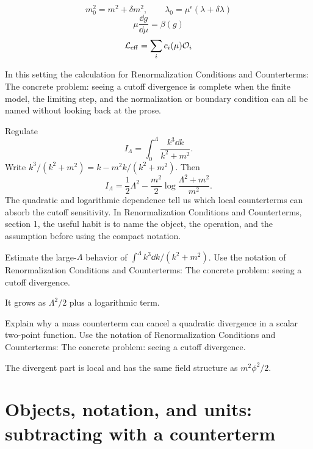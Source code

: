 \[
  m_0^2=m^2+\delta m^2,\qquad \lambda_0=\mu^\epsilon(\lambda+\delta\lambda)
\]
\[
  \mu\frac{\dd g}{\dd\mu}=\beta(g)
\]
\[
  \mathcal L_{\mathrm{eff}}=\sum_i c_i(\mu)\mathcal O_i
\]

In this setting the calculation for Renormalization Conditions and Counterterms: The concrete problem: seeing a cutoff divergence is complete when the finite model, the limiting step, and the normalization or boundary condition can all be named without looking back at the prose.




\begin{example}
Regulate
\[
  I_\Lambda=\int_0^\Lambda\frac{k^3\dd k}{k^2+m^2}.
\]
Write \(k^3/(k^2+m^2)=k-m^2k/(k^2+m^2)\).  Then
\[
  I_\Lambda=\frac12\Lambda^2-\frac{m^2}{2}\log\frac{\Lambda^2+m^2}{m^2}.
\]
The quadratic and logarithmic dependence tell us which local counterterms can absorb the cutoff sensitivity.  In Renormalization Conditions and Counterterms, section 1, the useful habit is to name the object, the operation, and the assumption before using the compact notation.
\end{example}



\begin{exercise}
Estimate the large-\(\Lambda\) behavior of \(\int^\Lambda k^3\dd k/(k^2+m^2)\).  Use the notation of Renormalization Conditions and Counterterms: The concrete problem: seeing a cutoff divergence.
\begin{answer}
It grows as \(\Lambda^2/2\) plus a logarithmic term.
\end{answer}
\end{exercise}

\begin{exercise}
Explain why a mass counterterm can cancel a quadratic divergence in a scalar two-point function.  Use the notation of Renormalization Conditions and Counterterms: The concrete problem: seeing a cutoff divergence.
\begin{answer}
The divergent part is local and has the same field structure as \(m^2\phi^2/2\).
\end{answer}
\end{exercise}



\section{Objects, notation, and units: subtracting with a counterterm}

